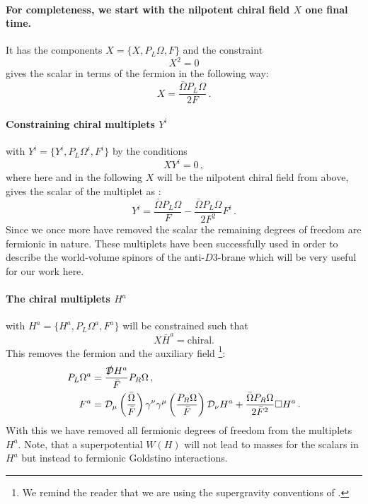 \documentclass[12pt]{report}
\newcommand{\be}{\begin{equation}}
\newcommand{\ee}{\end{equation}}
\newcommand{\bea}{\begin{equation}\begin{aligned}}
\newcommand{\eea}{\end{aligned}\end{equation}}
\begin{document}
\paragraph{For completeness, we start with the nilpotent chiral field $X$ one final time.} It has the components $X = \{X,P_L \Omega, F\}$ and the constraint
\be 
X^2 = 0
\ee
gives the scalar in terms of the fermion in the following way:
\be 
X = \frac{\bar{\Omega}P_L \Omega}{2F}\,.
\label{eq:nilconst}
\ee
\paragraph{Constraining chiral multiplets $Y^i$} with $Y^i = \{Y^i, P_L \Omega^i,F^i\}$ by the conditions
\be 
X Y^i =0\,,
\ee
where here and in the following $X$ will be the nilpotent chiral field from above, gives the scalar of the multiplet as \cite{Brignole:1997pe,DallAgata:2015pdd}:
\be 
Y^i=\frac{\bar{\Omega}P_L\Omega}{F}-\frac{\bar{\Omega}P_L \Omega}{2F^2}F^i\,.
\ee
Since we once more have removed the scalar the remaining degrees of freedom are fermionic in nature. These multiplets have been successfully used in order to describe the world-volume spinors of the anti-$D3$-brane \cite{Vercnocke:2016fbt,Kallosh:2016aep} which will be very useful for our work here.
\paragraph{The chiral multiplets $H^a$} with $H^a =\{H^a,P_L \Omega^a,F^a\}$ will be constrained such that 
\be 
X\bar{H}^a = \text{chiral.}
\ee
This removes the fermion and the auxiliary field \cite{Komargodski:2009rz}\footnote{We remind the reader that we are using the supergravity conventions of \cite{Freedman:2012zz}.}:
\bea
P_L\Omega^a &= \frac{\slashed{\mathcal{D}} H^a}{\bar{F}} P_R \Omega\,,\\
F^a &= \mathcal{D}_\mu \left(\frac{\bar{\Omega}}{\bar{F}}\right) \gamma^\nu \gamma^\mu \left(\frac{P_R\Omega}{\bar{F}} \right)\mathcal{D}_\nu H^a + \frac{\bar{\Omega}P_R\Omega}{2\bar{F}^2} \square H^a\,.
\eea
With this we have removed all fermionic degrees of freedom from the multiplets $H^a$. Note, that a superpotential $W(H)$ will not lead to masses for the scalars in $H^a$ but instead to fermionic Goldstino interactions.
\end{document}
